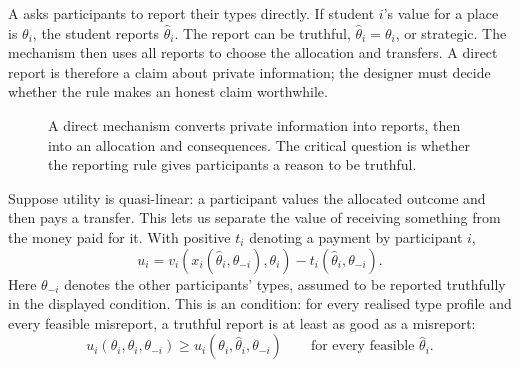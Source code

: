 A  asks participants to report their types directly.
If student \(i\)'s value for a place is \(\theta_i\), the student reports
\(\hat{\theta}_i\). The report can be truthful,
\(\hat{\theta}_i=\theta_i\), or strategic. The mechanism then uses all reports
to choose the allocation and transfers. A direct report is therefore a claim
about private information; the designer must decide whether the rule makes an
honest claim worthwhile.

\begin{figure}[htbp]
  \centering
  \caption{A direct mechanism converts private information into reports, then
  into an allocation and consequences. The critical question is whether the
  reporting rule gives participants a reason to be truthful.}
  \label{fig:direct-mechanism-flow}
\end{figure}
\FloatBarrier

Suppose utility is quasi-linear: a participant values the allocated outcome and
then pays a transfer. This lets us separate the value of receiving something
from the money paid for it. With positive \(t_i\) denoting a payment by
participant \(i\),
\[
u_i=v_i\!\left(x_i(\hat{\theta}_i,\theta_{-i}),\theta_i\right)
    -t_i(\hat{\theta}_i,\theta_{-i}).
\]
Here \(\theta_{-i}\) denotes the other participants' types, assumed to be
reported truthfully in the displayed condition. This is an  condition: for every realised type profile and every
feasible misreport, a truthful report is at least as good as a misreport:
\[
u_i(\theta_i,\theta_i,\theta_{-i})
\geq
u_i(\theta_i,\hat{\theta}_i,\theta_{-i})
\qquad\text{for every feasible }\hat{\theta}_i.
\]

